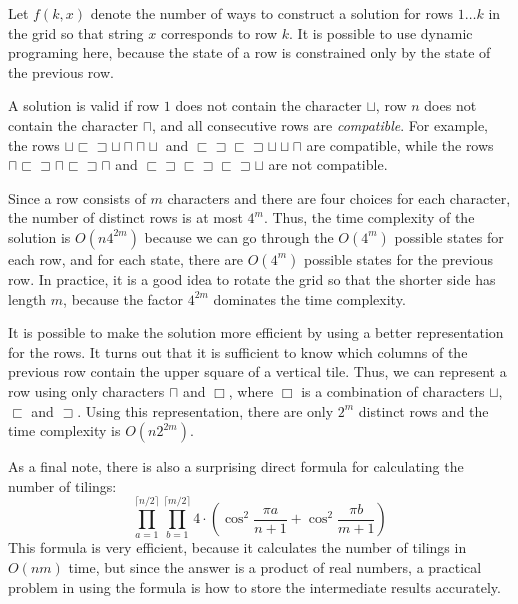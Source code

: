 Let $f(k,x)$ denote the number of ways to
construct a solution for rows $1 \ldots k$
in the grid so that string $x$ corresponds to row $k$.
It is possible to use dynamic programing here,
because the state of a row is constrained
only by the state of the previous row.

A solution is valid if row $1$ does not contain
the character $\sqcup$,
row $n$ does not contain the character $\sqcap$,
and all consecutive rows are \emph{compatible}.
For example, the rows
$\sqcup \sqsubset \sqsupset \sqcup \sqcap \sqcap \sqcup$ and
$\sqsubset \sqsupset \sqsubset \sqsupset \sqcup \sqcup \sqcap$ 
are compatible, while the rows
$\sqcap \sqsubset \sqsupset \sqcap \sqsubset \sqsupset \sqcap$ and
$\sqsubset \sqsupset \sqsubset \sqsupset \sqsubset \sqsupset \sqcup$
are not compatible.

Since a row consists of $m$ characters and there are
four choices for each character, the number of distinct
rows is at most $4^m$.
Thus, the time complexity of the solution is
$O(n 4^{2m})$ because we can go through the
$O(4^m)$ possible states for each row,
and for each state, there are $O(4^m)$
possible states for the previous row.
In practice, it is a good idea to rotate the grid
so that the shorter side has length $m$,
because the factor $4^{2m}$ dominates the time complexity.

It is possible to make the solution more efficient
by using a better representation for the rows.
It turns out that it is sufficient to know which
columns of the previous row contain the upper square
of a vertical tile.
Thus, we can represent a row using only characters
$\sqcap$ and $\Box$, where $\Box$ is a combination
of characters
$\sqcup$, $\sqsubset$ and $\sqsupset$.
Using this representation, there are only
$2^m$ distinct rows and the time complexity is
$O(n 2^{2m})$.

As a final note, there is also a surprising direct formula
for calculating the number of tilings:
\[ \prod_{a=1}^{\lceil n/2 \rceil} \prod_{b=1}^{\lceil m/2 \rceil} 4 \cdot (\cos^2 \frac{\pi a}{n + 1} + \cos^2 \frac{\pi b}{m+1})\]
This formula is very efficient, because it calculates
the number of tilings in $O(nm)$ time,
but since the answer is a product of real numbers,
a practical problem in using the formula is
how to store the intermediate results accurately.


